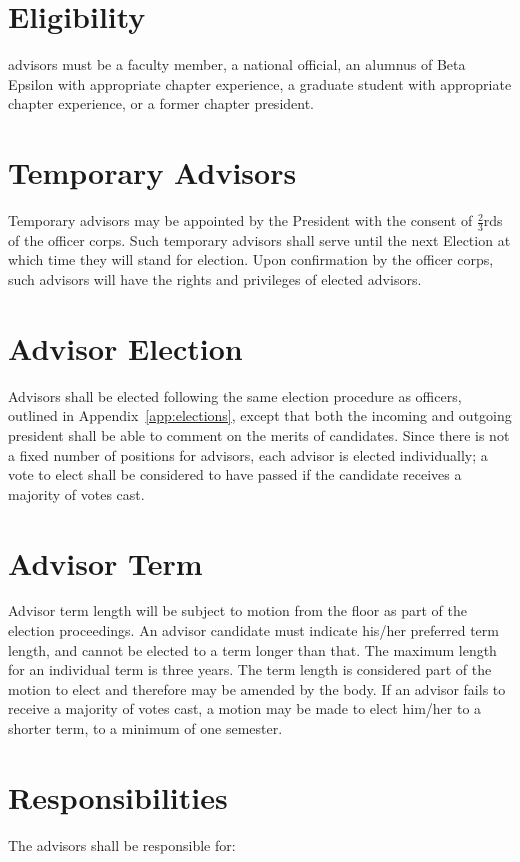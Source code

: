 \section{Eligibility}
advisors must be a faculty member, a national official, an alumnus of Beta Epsilon with appropriate chapter experience, a graduate student with appropriate chapter experience, or a former chapter president. 

\section{Temporary Advisors}
Temporary advisors may be appointed by the President with the consent of $\frac{2}{3}$rds of the officer corps. Such temporary advisors shall serve until the next Election at which time they will stand for election. Upon confirmation by the officer corps, such advisors will have the rights and privileges of elected advisors. 

\section{Advisor Election}
Advisors shall be elected following the same election procedure as officers, outlined in Appendix~\ref{app:elections}, except that both the incoming and outgoing president shall be able to comment on the merits of candidates. Since there is not a fixed number of positions for advisors, each advisor is elected individually; a vote to elect shall be considered to have passed if the candidate receives a majority of votes cast.

\section{Advisor Term}
Advisor term length will be subject to motion from the floor as part of the election proceedings. An advisor candidate must indicate his/her preferred term length, and cannot be elected to a term longer than that. The maximum length for an individual term is three years. The term length is considered part of the motion to elect and therefore may be amended by the body. If an advisor fails to receive a majority of votes cast, a motion may be made to elect him/her to a shorter term, to a minimum of one semester.

\section{Responsibilities}
The advisors shall be responsible for:

